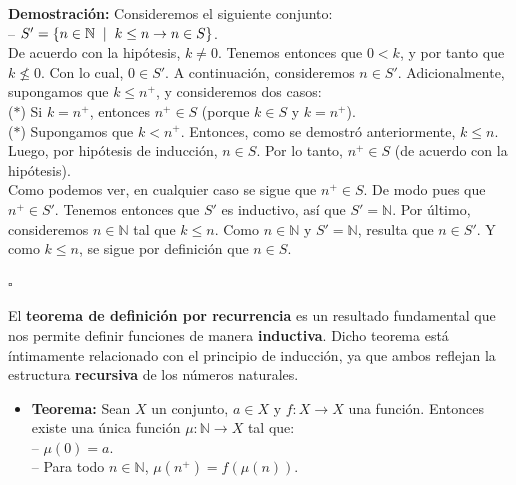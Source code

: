 \documentclass[10 pt]{article}
\begin{document}
\Large{\textbf{Demostración:} Consideremos el siguiente conjunto: \\

-- $S'=\{n \in \mathbb N \hspace{0.2 cm}|\hspace{0.2 cm} k \leq n \rightarrow n \in S \}$. \\

De acuerdo con la hipótesis, $k \neq 0$. Tenemos entonces que $0<k$, y por tanto que $k \nleq 0$. Con lo cual, $0 \in S'$. A continuación, consideremos $n \in S'$. Adicionalmente, supongamos que $k \leq n^+$, y consideremos dos casos: \\

($\ast$) Si $k=n^+$, entonces $n^+ \in S$ (porque $k \in S$ y $k=n^+$). \\

($\ast$) Supongamos que $k<n^+$. Entonces, como se demostró anteriormente, $k \leq n$. Luego, por hipótesis de inducción, $n \in S$. Por lo tanto, $n^+ \in S$ (de acuerdo con la hipótesis). \\

 Como podemos ver, en cualquier caso se sigue que $n^+ \in S$. De modo pues que $n^+ \in S'$. Tenemos entonces que $S'$ es inductivo, así que $S'=\mathbb N$. Por último, consideremos $n \in \mathbb N$ tal que $k \leq n$. Como $n \in \mathbb N$ y $S'=\mathbb N$, resulta que $n \in S'$. Y como $k \leq n$, se sigue por definición que $n \in S$.} \\

\begin{flushright}
   $\square$
\end{flushright}

\Large{El \textbf{teorema de definición por recurrencia} es un resultado fundamental que nos permite definir funciones de manera \textbf{inductiva}. Dicho teorema está íntimamente relacionado con el principio de inducción, ya que ambos reflejan la estructura \textbf{recursiva} de los números naturales.} \\

\begin{itemize}
    \item \Large{\textbf{Teorema:} Sean $X$ un conjunto, $a \in X$ y $f:X \rightarrow X$ una función. Entonces existe una única función $\mu:\mathbb N \rightarrow X$ tal que: \\

    -- $\mu(0)=a$. \\

    -- Para todo $n \in \mathbb N$, $\mu(n^+)=f(\mu(n))$.}\\
\end{itemize}
\end{document}
